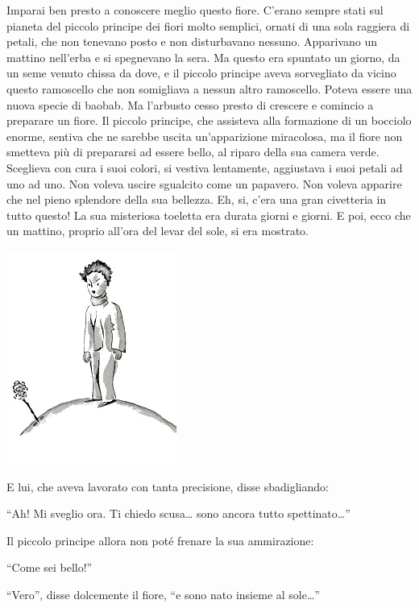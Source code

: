 \documentclass[11pt]{scrbook}
\begin{document}
Imparai ben presto a conoscere meglio questo fiore. C'erano sempre stati
sul pianeta del piccolo principe dei fiori molto semplici, ornati di una
sola raggiera di petali, che non tenevano posto e non disturbavano
nessuno. Apparivano un mattino nell'erba e si spegnevano la sera. Ma
questo era spuntato un giorno, da un seme venuto chissa da dove, e il
piccolo principe aveva sorvegliato da vicino questo ramoscello che non
somigliava a nessun altro ramoscello. Poteva essere una nuova specie di
baobab. Ma l'arbusto cesso presto di crescere e comincio a preparare un
fiore. Il piccolo principe, che assisteva alla formazione di un bocciolo
enorme, sentiva che ne sarebbe uscita un'apparizione miracolosa, ma il
fiore non smetteva più di prepararsi ad essere bello, al riparo della
sua camera verde. Sceglieva con cura i suoi colori, si vestiva
lentamente, aggiustava i suoi petali ad uno ad uno. Non voleva uscire
sgualcito come un papavero. Non voleva apparire che nel pieno splendore
della sua bellezza. Eh, si, c'era una gran civetteria in tutto questo!
La sua misteriosa toeletta era durata giorni e giorni. E poi, ecco che
un mattino, proprio all'ora del levar del sole, si era mostrato.

\begin{center}
\includegraphics{img/8a}
\end{center}

E lui, che aveva lavorato con tanta precisione, disse sbadigliando:

``Ah! Mi sveglio ora. Ti chiedo scusa\ldots{} sono ancora tutto
spettinato\ldots{}''

Il piccolo principe allora non poté frenare la sua ammirazione:

``Come sei bello!''

``Vero'', disse dolcemente il fiore, ``e sono nato insieme al
sole\ldots{}''
\end{document}
